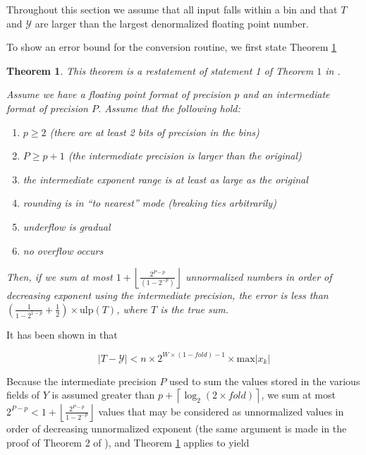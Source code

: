 \documentclass[12pt]{article}
\providecommand{\ceil}[1]{\left \lceil #1 \right \rceil }
\providecommand{\floor}[1]{\left \lfloor #1 \right \rfloor }
\providecommand{\max}{\ensuremath{\text{max}}}
\providecommand{\ulp}{\ensuremath{\text{ulp}}}
\theoremstyle{plain}
\newtheorem{thm}{Theorem}[section]
\numberwithin{equation}{section}
\begin{document}
    Throughout this section we assume that all input falls within a bin and that $T$ and $\mathcal{Y}$ are larger than the largest denormalized floating point number.

    To show an error bound for the conversion routine, we first state Theorem \ref{thm:sortsum}

    \begin{thm}
      This theorem is a restatement of statement 1 of Theorem $1$ in \cite{sortsum}.

      Assume we have a floating point format of precision $p$ and an intermediate format of precision $P$. Assume that the following hold:
      \begin{enumerate}
        \item $p \geq 2$ (there are at least 2 bits of precision in the bins)
        \item $P \geq p + 1$ (the intermediate precision is larger than the original)
        \item the intermediate exponent range is at least as large as the original
        \item rounding is in ``to nearest'' mode (breaking ties arbitrarily)
        \item underflow is gradual
        \item no overflow occurs
      \end{enumerate}
      Then, if we sum at most $1 + \floor{\frac{2^{P - p}}{(1 - 2^{-p})}}$ unnormalized numbers in order of decreasing exponent using the intermediate precision, the error is less than $(\frac{1}{1 - 2^{1 - p}} + \frac{1}{2})\times \ulp(T)$, where $T$ is the true sum.
      \label{thm:sortsum}
    \end{thm}

    It has been shown in \cite{repsum} that

    \begin{equation}
      \label{eq:repbound}
      |T - \mathcal{Y}| < n \times 2^{W \times (1 - fold) - 1} \times \max|x_k|
    \end{equation}

    Because the intermediate precision $P$ used to sum the values stored in the various fields of $Y$ is assumed greater than $p + \ceil{\log_2(2 \times fold)}$, we sum at most $2^{P - p} < 1 + \floor{\frac{2^{P - p}}{1 - 2^{-p}}}$ values that may be considered as unnormalized values in order of decreasing unnormalized exponent (the same argument is made in the proof of Theorem 2 of \cite{sortsum}), and Theorem \ref{thm:sortsum} applies to yield
\end{document}
